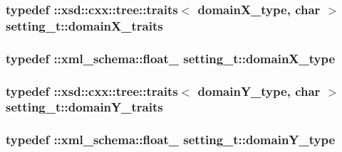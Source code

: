 \subsubsection[{\texorpdfstring{domain\+X\+\_\+traits}{domainX_traits}}]{\setlength{\rightskip}{0pt plus 5cm}typedef \+::xsd\+::cxx\+::tree\+::traits$<$ {\bf domain\+X\+\_\+type}, char $>$ {\bf setting\+\_\+t\+::domain\+X\+\_\+traits}}\hypertarget{classsetting__t_ab34396042c375f062bd2d6f062e15e67}{}\label{classsetting__t_ab34396042c375f062bd2d6f062e15e67}
\subsubsection[{\texorpdfstring{domain\+X\+\_\+type}{domainX_type}}]{\setlength{\rightskip}{0pt plus 5cm}typedef \+::{\bf xml\+\_\+schema\+::float\+\_\+} {\bf setting\+\_\+t\+::domain\+X\+\_\+type}}\hypertarget{classsetting__t_a1bf57fd62042e86d0e1e66f34fbaed31}{}\label{classsetting__t_a1bf57fd62042e86d0e1e66f34fbaed31}
\subsubsection[{\texorpdfstring{domain\+Y\+\_\+traits}{domainY_traits}}]{\setlength{\rightskip}{0pt plus 5cm}typedef \+::xsd\+::cxx\+::tree\+::traits$<$ {\bf domain\+Y\+\_\+type}, char $>$ {\bf setting\+\_\+t\+::domain\+Y\+\_\+traits}}\hypertarget{classsetting__t_a9c732c5a7483b203f6f456a57de341ed}{}\label{classsetting__t_a9c732c5a7483b203f6f456a57de341ed}
\subsubsection[{\texorpdfstring{domain\+Y\+\_\+type}{domainY_type}}]{\setlength{\rightskip}{0pt plus 5cm}typedef \+::{\bf xml\+\_\+schema\+::float\+\_\+} {\bf setting\+\_\+t\+::domain\+Y\+\_\+type}}\hypertarget{classsetting__t_a9f13bfe9cc42660cf1e89cff4afe9435}{}\label{classsetting__t_a9f13bfe9cc42660cf1e89cff4afe9435}
